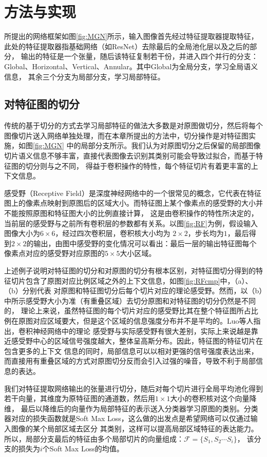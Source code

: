\section{方法与实现}
所提出的网络框架如图\ref{fig:MGN}所示，输入图像首先经过特征提取器提取特征，此处的特征提取器指基础网络（如ResNet）去除最后的全局池化层以及之后的部分，
输出的特征是一个张量，随后该特征复制若干份，并进入四个并行的分支：Global、Horizontal、Vertical、Annular。其中Global为全局分支，学习全局语义信息，
其余三个分支为局部分支，学习局部特征。

\subsection{对特征图的切分}
传统的基于切分的方式去学习局部特征的做法大多数是对原图做切分，然后将每个图像切片送入网络单独处理，而在本章所提出的方法中，切分操作是对特征图实施，如图\ref{fig:MGN}
中的局部分支所示。我们认为对原图切分之后保留的局部图像切片语义信息不够丰富，直接代表图像去识别其类别可能会导致过拟合，而基于特征图的切分则与之不同，
得益于卷积操作的特性，每个特征切片有着更丰富的上下文信息。


感受野（Receptive Field）是深度神经网络中的一个很常见的概念，它代表在特征图上的像素点映射到原图后的区域大小。而特征图上某个像素点的感受野的大小并不能按照原图和特征图大小的比例直接计算，
这是由卷积操作的特性所决定的，当前层的感受野与之前所有卷积层的参数都有关系。以图\ref{fig:RF}为例，假设输入图像大小为$6 \times 6$，经过四次卷积层，卷积核大小均为
$2 \times 2$，步长均为$1$，最后得到$2 \times 2$的输出，由图中感受野的变化情况可以看出：最后一层的输出特征图每个像素点对应的感受野对应原图的$5 \times 5$大小区域。


上述例子说明对特征图的切分和对原图的切分有根本区别，对特征图切分得到的特征切片包含了原图对应比例区域之外的上下文信息，如图\ref{fig:RFcmp}中，（a）、（b）分别代表
对原图和特征图切分后每个切片对应的理论感受野。然而，以（b）中所示感受野大小为准（有重叠区域）去切分原图和对特征图的切分仍然是不同的，
理论上来说，虽然特征图的每个切片对应的感受野比其在整个特征图所占比例在原图对应区域要大，但是这个区域的信息强度分布并不是平均的。Luo等人指出，卷积神经网络中的理论
感受野与实际感受野有很大差别，实际上来说越是靠近感受野中心的区域信号强度越大，整体呈高斯分布\cite{luo2016understanding}。因此，特征图的特征切片在包含更多的上下文
信息的同时，局部信息可以以相对更强的信号强度表达出来，而直接用有重叠区域的方式对原图切分反而会引入过强的噪音，导致不利于局部信息的表达。

我们对特征提取网络输出的张量进行切分，随后对每个切片进行全局平均池化得到若干向量，其维度为原特征图的通道数，然后用$1 \times 1$大小的卷积核对这个向量降维，
最后以降维后的向量作为局部特征的表示送入分类器学习原图的类别。分类器对应的损失函数就是Soft Max Loss，这么做的出发点是希望网络可以仅通过输入图像的某个局部区域去区分
其类别，这样可以提高局部区域特征的表达能力。所以，局部分支最后的特征由多个局部切片的向量组成：$\mathcal{F}=\{S_{1},S_{2}\cdots S_{i}\}$，
该分支的损失为$i$个Soft Max Loss的均值。
